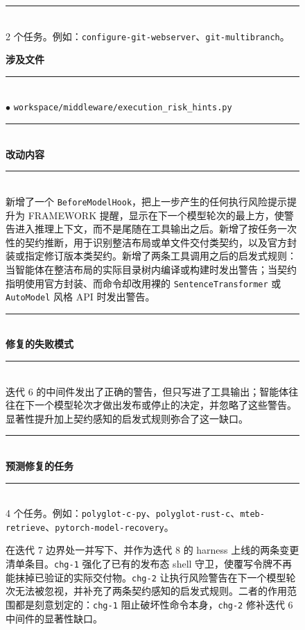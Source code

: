 \begin{figure}[t]
\begin{tcbraster}
\begin{tcolorbox}[colback=aheSky!18,colframe=aheNavy,colbacktitle=aheNavy,
                          title={\scriptsize\textbf{chg-1，迭代 8，commit \texttt{ca35f53}，层级：工具实现}}]
            \rule{\linewidth}{0.3pt}\\[1pt]
            2 个任务。例如：\texttt{configure-git-webserver}、\texttt{git-multibranch}。
        \end{tcolorbox}
        \begin{tcolorbox}[colback=aheTeal!12,colframe=aheBlue,colbacktitle=aheBlue,
                          title={\scriptsize\textbf{chg-2，迭代 8，commit \texttt{a4a4a29}，层级：中间件}}]
            \textbf{\textcolor{aheBlue}{涉及文件}} \\
            \rule{\linewidth}{0.3pt}\\[1pt]
            $\bullet$ \texttt{workspace/middleware/execution\_risk\_hints.py} \\[3pt]
            \rule{\linewidth}{0.3pt}\\
            \textbf{\textcolor{aheBlue}{改动内容}} \\
            \rule{\linewidth}{0.3pt}\\[1pt]
            新增了一个 \texttt{BeforeModelHook}，把上一步产生的任何执行风险提示提升为 FRAMEWORK 提醒，显示在下一个模型轮次的最上方，使警告进入推理上下文，而不是尾随在工具输出之后。新增了按任务一次性的契约推断，用于识别整洁布局或单文件交付类契约，以及官方封装或指定修订版本类契约。新增了两条工具调用之后的启发式规则：当智能体在整洁布局的实际目录树内编译或构建时发出警告；当契约指明使用官方封装、而命令却改用裸的 \texttt{SentenceTransformer} 或 \texttt{AutoModel} 风格 API 时发出警告。 \\[3pt]
            \rule{\linewidth}{0.3pt}\\
            \textbf{\textcolor{aheBlue}{修复的失败模式}} \\
            \rule{\linewidth}{0.3pt}\\[1pt]
            迭代 6 的中间件发出了正确的警告，但只写进了工具输出；智能体往往在下一个模型轮次才做出发布或停止的决定，并忽略了这些警告。显著性提升加上契约感知的启发式规则弥合了这一缺口。 \\[3pt]
            \rule{\linewidth}{0.3pt}\\
            \textbf{\textcolor{aheBlue}{预测修复的任务}} \\
            \rule{\linewidth}{0.3pt}\\[1pt]
            4 个任务。例如：\texttt{polyglot-c-py}、\texttt{polyglot-rust-c}、\texttt{mteb-retrieve}、\texttt{pytorch-model-recovery}。
        \end{tcolorbox}
    \end{tcbraster}
    \caption{在迭代 7 边界处一并写下、并作为迭代 8 的 harness 上线的两条变更清单条目。\texttt{chg-1} 强化了已有的发布态 shell 守卫，使覆写令牌不再能抹掉已验证的实际交付物。\texttt{chg-2} 让执行风险警告在下一个模型轮次无法被忽视，并补充了两条契约感知的启发式规则。二者的作用范围都是刻意划定的：\texttt{chg-1} 阻止破坏性命令本身，\texttt{chg-2} 修补迭代 6 中间件的显著性缺口。}
    \label{fig:manifest-hardblock}
\end{figure}
